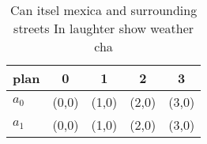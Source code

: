 \documentclass[a4paper]{article}
\begin{document}
\begin{table}
\begin{adjustbox}{width=0.5\columnwidth}
\begin{tabular}{|l|l|l|l|l|}
\hline
\textbf{plan} & \multicolumn{1}{c|}{\textbf{0}} & \multicolumn{1}{c|}{\textbf{1}} & \multicolumn{1}{c|}{\textbf{2}} & \multicolumn{1}{c|}{\textbf{3}} \\ \hline
\textbf{$a_0$}  & (0,0) & (1,0) & (2,0) & (3,0) \\ \hline
\textbf{$a_1$}  & (0,0) & (1,0) & (2,0) & (3,0) \\ \hline
\end{tabular}
\end{adjustbox}
\caption{Can itsel mexica and surrounding streets In laughter show weather cha
}
\end{table}
\end{document}
